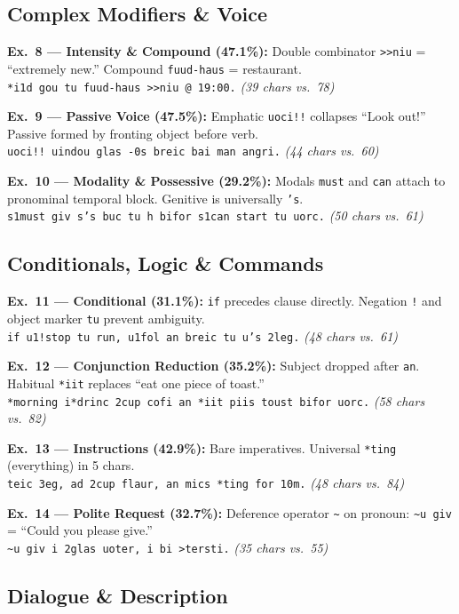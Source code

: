 \documentclass[10pt,onecolumn,letterpaper]{article}
\newcommand{\me}[1]{\texttt{#1}}
\begin{document}
\subsection{Complex Modifiers \& Voice}

\textbf{Ex.~8 --- Intensity \& Compound (47.1\%):} Double combinator \me{>>niu} = ``extremely new.'' Compound \me{fuud-haus} = restaurant.\\
\me{*i1d gou tu fuud-haus >>niu @ 19:00.} \textit{(39 chars vs.\ 78)}

\textbf{Ex.~9 --- Passive Voice (47.5\%):} Emphatic \me{uoci!!} collapses ``Look out!'' Passive formed by fronting object before verb.\\
\me{uoci!! uindou glas -0s breic bai man angri.} \textit{(44 chars vs.\ 60)}

\textbf{Ex.~10 --- Modality \& Possessive (29.2\%):} Modals \me{must} and \me{can} attach to pronominal temporal block. Genitive is universally \me{'s}.\\
\me{s1must giv s's buc tu h bifor s1can start tu uorc.} \textit{(50 chars vs.\ 61)}

\subsection{Conditionals, Logic \& Commands}

\textbf{Ex.~11 --- Conditional (31.1\%):} \me{if} precedes clause directly. Negation \me{!} and object marker \me{tu} prevent ambiguity.\\
\me{if u1!stop tu run, u1fol an breic tu u's 2leg.} \textit{(48 chars vs.\ 61)}

\textbf{Ex.~12 --- Conjunction Reduction (35.2\%):} Subject dropped after \me{an}. Habitual \me{*iit} replaces ``eat one piece of toast.''\\
\me{*morning i*drinc 2cup cofi an *iit piis toust bifor uorc.} \textit{(58 chars vs.\ 82)}

\textbf{Ex.~13 --- Instructions (42.9\%):} Bare imperatives. Universal \me{*ting} (everything) in 5 chars.\\
\me{teic 3eg, ad 2cup flaur, an mics *ting for 10m.} \textit{(48 chars vs.\ 84)}

\textbf{Ex.~14 --- Polite Request (32.7\%):} Deference operator \me{\~{}} on pronoun: \me{\~{}u giv} = ``Could you please give.''\\
\me{\~{}u giv i 2glas uoter, i bi >tersti.} \textit{(35 chars vs.\ 55)}

\subsection{Dialogue \& Description}
\end{document}
